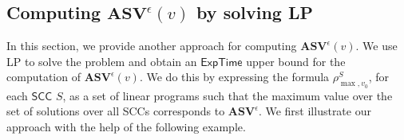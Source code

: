 \subsection{Computing $\mathbf{ASV}^{\epsilon}(v)$ by solving LP}
In this section, we provide another approach for computing $\mathbf{ASV}^{\epsilon}(v)$.
We use LP to solve the problem and obtain an $\mathsf{ExpTime}$ upper bound for the computation of $\mathbf{ASV}^{\epsilon}(v)$.
We do this by expressing the formula $\rho^S_{\max,v_0}$, for each $\mathsf{SCC}$ $S$, as a set of linear programs such that the maximum value over the set of solutions over all {\sf SCC}s corresponds to $\mathbf{ASV}^{\epsilon}$. 
We first illustrate our approach with the help of the following example.
